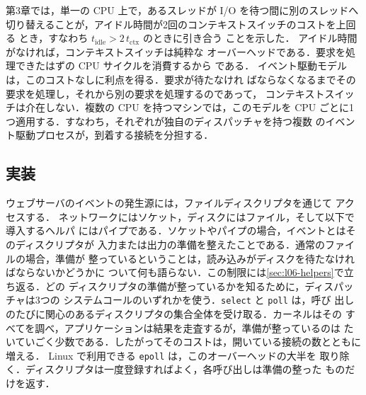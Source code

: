 \documentclass[../main.tex]{subfiles}
\begin{document}
第3章では，単一の CPU 上で，あるスレッドが I/O を待つ間に別のスレッドへ
切り替えることが，アイドル時間が2回のコンテキストスイッチのコストを上回る
とき，すなわち $t_{\mathrm{idle}} > 2\, t_{\mathrm{ctx}}$ のときに引き合う
ことを示した．%
%
アイドル時間がなければ，コンテキストスイッチは純粋な
オーバーヘッドである．要求を処理できたはずの CPU サイクルを消費するから
である．%
イベント駆動モデルは，このコストなしに利点を得る．要求が待たなけれ
ばならなくなるまでその要求を処理し，それから別の要求を処理するのであって，
コンテキストスイッチは介在しない．複数の CPU を持つマシンでは，このモデルを
CPU ごとに1つ適用する．すなわち，それぞれが独自のディスパッチャを持つ複数
のイベント駆動プロセスが，到着する接続を分担する．

\subsection{実装}

ウェブサーバのイベントの発生源には，ファイルディスクリプタを通じて
アクセスする．
ネットワークにはソケット，ディスクにはファイル，そして以下で導入するヘルパ
にはパイプである．ソケットやパイプの場合，イベントとはそのディスクリプタが
入力または出力の準備を整えたことである．通常のファイルの場合，準備が
整っているということは，読み込みがディスクを待たなければならないかどうかに
ついて何も語らない．この制限には\cref{sec:l06-helpers}で立ち返る．どの
ディスクリプタの準備が整っているかを知るために，ディスパッチャは3つの
システムコールのいずれかを使う．\texttt{select} と \texttt{poll} は，呼び
出しのたびに関心のあるディスクリプタの集合全体を受け取る．カーネルはその
すべてを調べ，アプリケーションは結果を走査するが，準備が整っているのは
たいていごく少数である．したがってそのコストは，開いている接続の数とともに
増える．%
Linux で利用できる \texttt{epoll} は，このオーバーヘッドの大半を
取り除く．ディスクリプタは一度登録すればよく，各呼び出しは準備の整った
ものだけを返す．%
\end{document}
